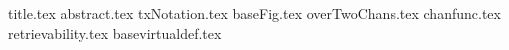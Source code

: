 \documentclass{llncs}
\begin{document}
\pagestyle{plain}
{title.tex}
{abstract.tex}
{txNotation.tex}
{baseFig.tex}
{overTwoChans.tex}
{chanfunc.tex}
{retrievability.tex}
{basevirtualdef.tex}

\end{document}
